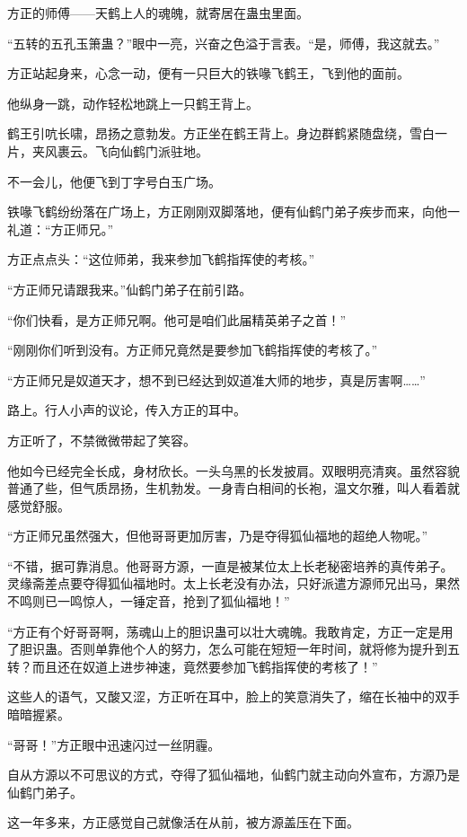 \begin{this_body}
方正的师傅——天鹤上人的魂魄，就寄居在蛊虫里面。

“五转的五孔玉箫蛊？”眼中一亮，兴奋之色溢于言表。“是，师傅，我这就去。”

方正站起身来，心念一动，便有一只巨大的铁喙飞鹤王，飞到他的面前。

他纵身一跳，动作轻松地跳上一只鹤王背上。

鹤王引吭长啸，昂扬之意勃发。方正坐在鹤王背上。身边群鹤紧随盘绕，雪白一片，夹风裹云。飞向仙鹤门派驻地。

不一会儿，他便飞到丁字号白玉广场。

铁喙飞鹤纷纷落在广场上，方正刚刚双脚落地，便有仙鹤门弟子疾步而来，向他一礼道：“方正师兄。”

方正点点头：“这位师弟，我来参加飞鹤指挥使的考核。”

“方正师兄请跟我来。”仙鹤门弟子在前引路。

“你们快看，是方正师兄啊。他可是咱们此届精英弟子之首！”

“刚刚你们听到没有。方正师兄竟然是要参加飞鹤指挥使的考核了。”

“方正师兄是奴道天才，想不到已经达到奴道准大师的地步，真是厉害啊……”

路上。行人小声的议论，传入方正的耳中。

方正听了，不禁微微带起了笑容。

他如今已经完全长成，身材欣长。一头乌黑的长发披肩。双眼明亮清爽。虽然容貌普通了些，但气质昂扬，生机勃发。一身青白相间的长袍，温文尔雅，叫人看着就感觉舒服。

“方正师兄虽然强大，但他哥哥更加厉害，乃是夺得狐仙福地的超绝人物呢。”

“不错，据可靠消息。他哥哥方源，一直是被某位太上长老秘密培养的真传弟子。灵缘斋差点要夺得狐仙福地时。太上长老没有办法，只好派遣方源师兄出马，果然不鸣则已一鸣惊人，一锤定音，抢到了狐仙福地！”

“方正有个好哥哥啊，荡魂山上的胆识蛊可以壮大魂魄。我敢肯定，方正一定是用了胆识蛊。否则单靠他个人的努力，怎么可能在短短一年时间，就将修为提升到五转？而且还在奴道上进步神速，竟然要参加飞鹤指挥使的考核了！”

这些人的语气，又酸又涩，方正听在耳中，脸上的笑意消失了，缩在长袖中的双手暗暗握紧。

“哥哥！”方正眼中迅速闪过一丝阴霾。

自从方源以不可思议的方式，夺得了狐仙福地，仙鹤门就主动向外宣布，方源乃是仙鹤门弟子。

这一年多来，方正感觉自己就像活在从前，被方源盖压在下面。


\end{this_body}
